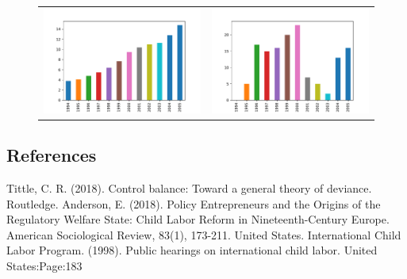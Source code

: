 \documentclass[a4paper, 11pt, margin=1in]{article}
\begin{document}
\begin{figure}[h]
   \centering
   \begin{tabular}{c c}
       \includegraphics[page=1,width=.6\textwidth]{fig.pdf} & 
       \includegraphics[page=1,width=.6\textwidth]{fig2.pdf} \\
   \end{tabular}
\end{figure}

%
%

\subsection{References}
\begin{thebibliography}{9}
    Tittle, C. R. (2018). Control balance: Toward a general theory of deviance. Routledge.
    Anderson, E. (2018). Policy Entrepreneurs and the Origins of the Regulatory Welfare State: Child Labor Reform in Nineteenth-Century Europe. American Sociological Review, 83(1), 173-211.
    United States. International Child Labor Program. (1998). Public hearings on international child labor. United States:Page:183
\end{thebibliography}
\end{document}

